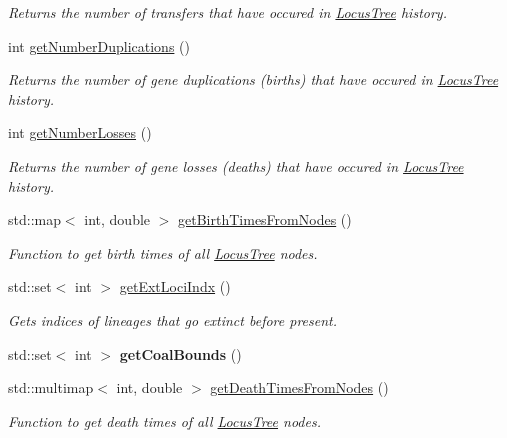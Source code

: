 \begin{DoxyCompactItemize}
\begin{DoxyCompactList}\small\item\em Returns the number of transfers that have occured in \mbox{\hyperlink{class_locus_tree}{Locus\+Tree}} history. \end{DoxyCompactList}\item 
int \mbox{\hyperlink{class_locus_tree_a5ab14226be51de0219ac2eee98b18dec}{get\+Number\+Duplications}} ()
\begin{DoxyCompactList}\small\item\em Returns the number of gene duplications (births) that have occured in \mbox{\hyperlink{class_locus_tree}{Locus\+Tree}} history. \end{DoxyCompactList}\item 
int \mbox{\hyperlink{class_locus_tree_a4bbad232a6763f1c7a16162cd50ae12d}{get\+Number\+Losses}} ()
\begin{DoxyCompactList}\small\item\em Returns the number of gene losses (deaths) that have occured in \mbox{\hyperlink{class_locus_tree}{Locus\+Tree}} history. \end{DoxyCompactList}\item 
std\+::map$<$ int, double $>$ \mbox{\hyperlink{class_locus_tree_a230fa4aeec913f6d567c0021efe83cce}{get\+Birth\+Times\+From\+Nodes}} ()
\begin{DoxyCompactList}\small\item\em Function to get birth times of all \mbox{\hyperlink{class_locus_tree}{Locus\+Tree}} nodes. \end{DoxyCompactList}\item 
std\+::set$<$ int $>$ \mbox{\hyperlink{class_locus_tree_abf6fca34687f1cbe128caae5d1ac737f}{get\+Ext\+Loci\+Indx}} ()
\begin{DoxyCompactList}\small\item\em Gets indices of lineages that go extinct before present. \end{DoxyCompactList}\item 
\mbox{\label{class_locus_tree_a6ab81966cf57c64fd765d82118ac3396}} 
std\+::set$<$ int $>$ {\bfseries get\+Coal\+Bounds} ()
\item 
std\+::multimap$<$ int, double $>$ \mbox{\hyperlink{class_locus_tree_a5cb41c31ce0966a42a14bf533a59628b}{get\+Death\+Times\+From\+Nodes}} ()
\begin{DoxyCompactList}\small\item\em Function to get death times of all \mbox{\hyperlink{class_locus_tree}{Locus\+Tree}} nodes. \end{DoxyCompactList}\item 

\end{DoxyCompactItemize}
